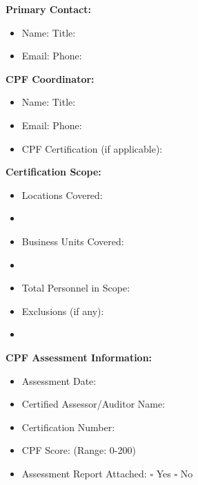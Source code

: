 \documentclass[11pt,a4paper]{article}
\begin{document}
\textbf{Primary Contact:}
\begin{itemize}
\item Name: \underline{\hspace{8cm}} Title: \underline{\hspace{5cm}}
\item Email: \underline{\hspace{8cm}} Phone: \underline{\hspace{5cm}}
\end{itemize}

\textbf{CPF Coordinator:}
\begin{itemize}
\item Name: \underline{\hspace{8cm}} Title: \underline{\hspace{5cm}}
\item Email: \underline{\hspace{8cm}} Phone: \underline{\hspace{5cm}}
\item CPF Certification (if applicable): \underline{\hspace{6cm}}
\end{itemize}

\textbf{Certification Scope:}
\begin{itemize}
\item Locations Covered: \underline{\hspace{10cm}}
\item \underline{\hspace{12cm}}
\item Business Units Covered: \underline{\hspace{10cm}}
\item \underline{\hspace{12cm}}
\item Total Personnel in Scope: \underline{\hspace{4cm}}
\item Exclusions (if any): \underline{\hspace{10cm}}
\item \underline{\hspace{12cm}}
\end{itemize}

\textbf{CPF Assessment Information:}
\begin{itemize}
\item Assessment Date: \underline{\hspace{4cm}}
\item Certified Assessor/Auditor Name: \underline{\hspace{8cm}}
\item Certification Number: \underline{\hspace{6cm}}
\item CPF Score: \underline{\hspace{3cm}} (Range: 0-200)
\item Assessment Report Attached: $\square$ Yes $\square$ No
\end{itemize}
\end{document}
